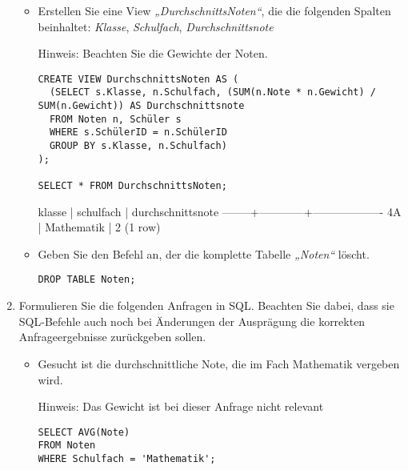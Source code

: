 \documentclass{bschlangaul-aufgabe}
\begin{document}
\begin{enumerate}
\begin{itemize}
\item Erstellen Sie eine View \emph{„DurchschnittsNoten“}, die die
folgenden Spalten beinhaltet: \emph{Klasse}, \emph{Schulfach}, \emph{Durchschnittsnote}

Hinweis: Beachten Sie die Gewichte der Noten.

\begin{bAntwort}
\begin{verbatim}
CREATE VIEW DurchschnittsNoten AS (
  (SELECT s.Klasse, n.Schulfach, (SUM(n.Note * n.Gewicht) / SUM(n.Gewicht)) AS Durchschnittsnote
  FROM Noten n, Schüler s
  WHERE s.SchülerID = n.SchülerID
  GROUP BY s.Klasse, n.Schulfach)
);

SELECT * FROM DurchschnittsNoten;
\end{verbatim}

\begin{bSqlErgebnis}
 klasse | schulfach  | durchschnittsnote
--------+------------+-------------------
 4A     | Mathematik |                 2
(1 row)
\end{bSqlErgebnis}
\end{bAntwort}

\item Geben Sie den Befehl an, der die komplette Tabelle \emph{„Noten“}
löscht.

\begin{bAntwort}
\begin{verbatim}
DROP TABLE Noten;
\end{verbatim}
\end{bAntwort}

\end{itemize}


\item Formulieren Sie die folgenden Anfragen in SQL. Beachten Sie dabei,
dass sie SQL-Befehle auch noch bei Änderungen der Ausprägung die
korrekten Anfrageergebnisse zurückgeben sollen.

\begin{itemize}

%

\item Gesucht ist die durchschnittliche Note, die im Fach Mathematik
vergeben wird.

Hinweis: Das Gewicht ist bei dieser Anfrage nicht relevant

\begin{bAntwort}
\begin{verbatim}
SELECT AVG(Note)
FROM Noten
WHERE Schulfach = 'Mathematik';
\end{verbatim}
\end{bAntwort}


\end{itemize}
\end{enumerate}
\end{document}
